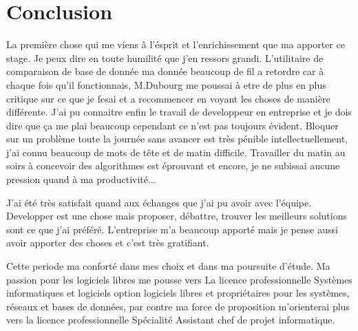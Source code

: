 \chapter{Conclusion}

La première chose qui me viens à l'ésprit et l'enrichissement que ma apporter
ce stage. Je peux dire en toute humilité que j'en ressors grandi. L'utilitaire
de comparaison de base de donnée ma donnée beaucoup de fil a retordre car à
chaque fois qu'il fonctionnais, M.Dubourg me poussai à etre de plus en plus
critique sur ce que je fesai et a recommencer en voyant les choses de manière
différente. J'ai pu connaitre enfin le travail de developpeur en entreprise et
je dois dire que ça me plai beaucoup cependant ce n'est pas toujours évident.
Bloquer sur un problème toute la journée sans avancer est très pénible
intellectuellement, j'ai connu beaucoup de mots de tête et de matin difficile.
Travailler du matin au soirs à concevoir des algorithmes est éprouvant et
encore, je ne subissai aucune pression quand à ma productivité...

J'ai été très satisfait quand aux échanges que j'ai pu avoir avec l'équipe.
Developper est une chose mais proposer, débattre, trouver les meilleurs
solutions sont ce que j'ai préféré. L'entreprise m'a beaucoup apporté mais je
pense aussi avoir apporter des choses et c'est très gratifiant.

Cette periode ma conforté dans mes choix et dans ma poursuite d'étude. Ma
passion pour les logiciels libres me pousse vers La licence professionnelle
Systèmes informatiques et logiciels option logiciels libres et propriétaires
pour les systèmes, réseaux et bases de données, par contre ma force de
proposition m'orienterai plus vers la licence professionnelle Spécialité
Assistant chef de projet informatique.
